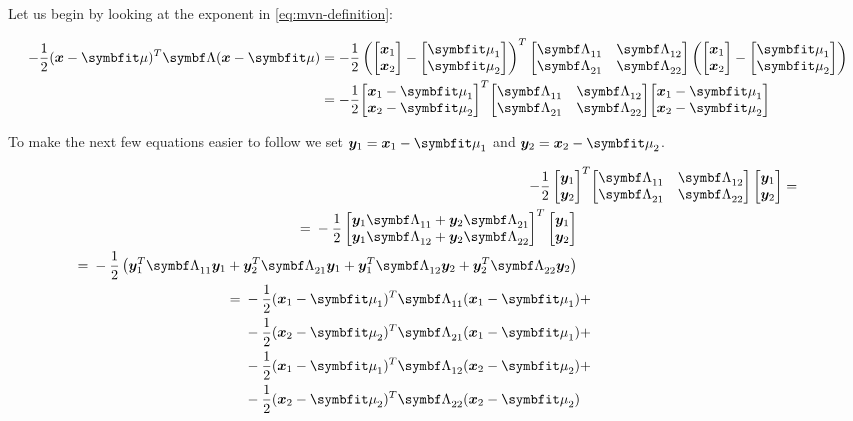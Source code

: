 Let us begin by looking at the exponent in \eqref{eq:mvn-definition}:

\begin{align}
  -\frac{1}{2} (\vx - \vmu)^T \mLambda (\vx - \vmu) &=
  -\frac{1}{2} \left(\partx - \partmu \right)^T \partlambda \left(\partx - \partmu \right) \\
                                                    &= -\frac{1}{2} \partxmu^T \partlambda \partxmu
\end{align}

To make the next few equations easier to follow we set $\vy_1 = \vx_1 - \vmu_1$ and $\vy_2 = \vx_2 - \vmu_2$.

\begin{align}
    -\frac{1}{2} \begin{bmatrix} \vy_1 \\ \vy_2 \end{bmatrix} ^T & \partlambda \begin{bmatrix} \vy_1 \\ \vy_2 \end{bmatrix} = \\
  \begin{split}
    ={}& -\frac{1}{2} \begin{bmatrix} \vy_1 \ml{11} + \vy_2 \ml{21} \\ \vy_1 \ml{12} + \vy_2 \ml{22} \end{bmatrix} ^T \begin{bmatrix} \vy_1 \\ \vy_2 \end{bmatrix}
  \end{split} \\
  \begin{split}
    ={}& -\frac{1}{2} \left( \vy_1^T \ml{11} \vy_1 + \vy_2^T \ml{21} \vy_1 + \vy_1^T \ml{12} \vy_2 + \vy_2^T \ml{22} \vy_2 \right)
  \end{split} \\
  \begin{split}
    ={}& -\frac{1}{2} (\vx_1 - \vmu_1)^T \ml{11} (\vx_1 - \vmu_1) {}+ \\
       &-\frac{1}{2} (\vx_2 - \vmu_2)^T \ml{21} (\vx_1 - \vmu_1) {}+ \\
       &-\frac{1}{2} (\vx_1 - \vmu_1)^T \ml{12} (\vx_2 - \vmu_2) {}+ \\
       &-\frac{1}{2} (\vx_2 - \vmu_2)^T \ml{22} (\vx_2 - \vmu_2) \label{eq:mvn-quadratic-form}
  \end{split}
\end{align}

